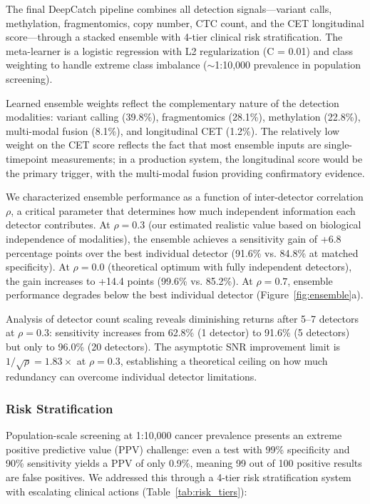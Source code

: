 \documentclass[10pt,a4paper]{article}
\begin{document}
The final DeepCatch pipeline combines all detection signals—variant calls, methylation, fragmentomics, copy number, CTC count, and the CET longitudinal score—through a stacked ensemble with 4-tier clinical risk stratification. The meta-learner is a logistic regression with L2 regularization (C = 0.01) and class weighting to handle extreme class imbalance ($\sim$1:10,000 prevalence in population screening).

Learned ensemble weights reflect the complementary nature of the detection modalities: variant calling (39.8\%), fragmentomics (28.1\%), methylation (22.8\%), multi-modal fusion (8.1\%), and longitudinal CET (1.2\%). The relatively low weight on the CET score reflects the fact that most ensemble inputs are single-timepoint measurements; in a production system, the longitudinal score would be the primary trigger, with the multi-modal fusion providing confirmatory evidence.

We characterized ensemble performance as a function of inter-detector correlation $\rho$, a critical parameter that determines how much independent information each detector contributes. At $\rho = 0.3$ (our estimated realistic value based on biological independence of modalities), the ensemble achieves a sensitivity gain of +6.8 percentage points over the best individual detector (91.6\% vs. 84.8\% at matched specificity). At $\rho = 0.0$ (theoretical optimum with fully independent detectors), the gain increases to +14.4 points (99.6\% vs. 85.2\%). At $\rho = 0.7$, ensemble performance degrades below the best individual detector (Figure~\ref{fig:ensemble}a).

Analysis of detector count scaling reveals diminishing returns after 5--7 detectors at $\rho = 0.3$: sensitivity increases from 62.8\% (1 detector) to 91.6\% (5 detectors) but only to 96.0\% (20 detectors). The asymptotic SNR improvement limit is $1/\sqrt{\rho} = 1.83\times$ at $\rho = 0.3$, establishing a theoretical ceiling on how much redundancy can overcome individual detector limitations.

\subsubsection{Risk Stratification}

Population-scale screening at 1:10,000 cancer prevalence presents an extreme positive predictive value (PPV) challenge: even a test with 99\% specificity and 90\% sensitivity yields a PPV of only 0.9\%, meaning 99 out of 100 positive results are false positives. We addressed this through a 4-tier risk stratification system with escalating clinical actions (Table~\ref{tab:risk_tiers}):
\end{document}
